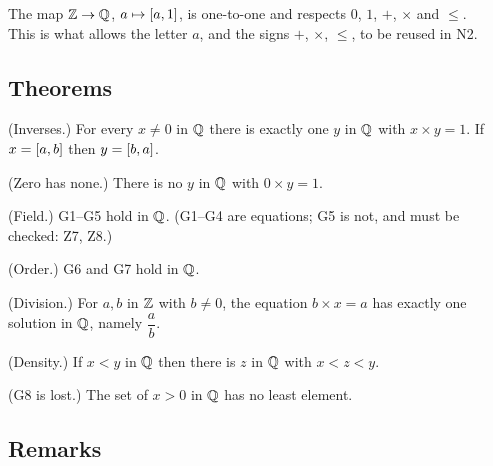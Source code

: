 \begin{lines}
\item[\lab{P6}] The map $\mathbb{Z} \to \mathbb{Q}$, $a \mapsto [a,1]$, is one-to-one and respects $0$, $1$, $+$, $\times$ and $\le$. \\
This is what allows the letter $a$, and the signs $+$, $\times$, $\le$, to be reused in N2.
\end{lines}

\subsection*{Theorems}

\begin{lines}
\item[\lab{T1}] (Inverses.) For every $x \neq 0$ in $\mathbb{Q}$ there is exactly one $y$ in $\mathbb{Q}$ with $x \times y = 1$. If $x = [a,b]$ then $y = [b,a]$.
\item[\lab{T2}] (Zero has none.) There is no $y$ in $\mathbb{Q}$ with $0 \times y = 1$.
\item[\lab{T3}] (Field.) G1--G5 hold in $\mathbb{Q}$. (G1--G4 are equations; G5 is not, and must be checked: Z7, Z8.)
\item[\lab{T4}] (Order.) G6 and G7 hold in $\mathbb{Q}$.
\item[\lab{T5}] (Division.) For $a, b$ in $\mathbb{Z}$ with $b \neq 0$, the equation $b \times x = a$ has exactly one solution in $\mathbb{Q}$, namely $\dfrac{a}{b}$.
\item[\lab{T6}] (Density.) If $x < y$ in $\mathbb{Q}$ then there is $z$ in $\mathbb{Q}$ with $x < z < y$.
\item[\lab{T7}] (G8 is lost.) The set of $x > 0$ in $\mathbb{Q}$ has no least element.
\end{lines}

\subsection*{Remarks}

